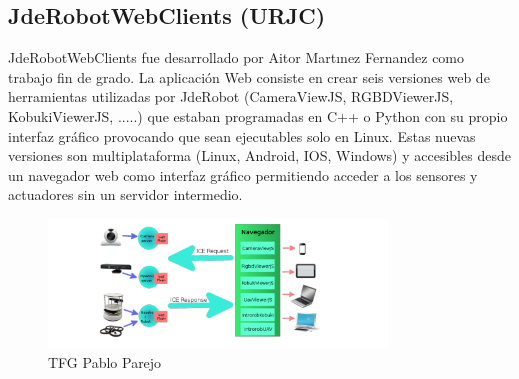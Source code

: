 \subsection{JdeRobotWebClients (URJC)}
JdeRobotWebClients fue desarrollado por Aitor Martınez Fernandez como trabajo fin de grado. La aplicación Web consiste en crear seis versiones web de herramientas utilizadas por JdeRobot (CameraViewJS, RGBDViewerJS, KobukiViewerJS, .....) que estaban programadas en C++ o Python con su propio interfaz gráfico provocando que sean ejecutables solo en Linux.
Estas nuevas versiones son multiplataforma (Linux, Android, IOS, Windows) y accesibles desde un navegador web como interfaz gráfico permitiendo acceder a los sensores y actuadores sin un servidor intermedio.

\begin{figure}[H]
    \centering
    \includegraphics[width=90mm]{memoria/LaTeX/img/introduccion/jdro.png}
    \caption{TFG Pablo Parejo}
\end{figure}